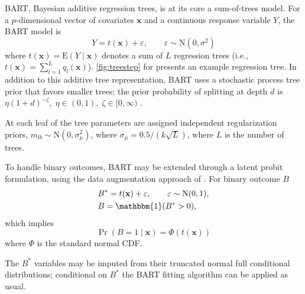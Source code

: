 \documentclass[aoas,preprint, 11pt, dvipsnames, table, x11name]{imsart}
\newcommand{\E}{\mbox{E}}
\newcommand{\N}{\mbox{N}}
\renewcommand{\bm}[1]{\mathbf{#1}}
\theoremstyle{remark}
\begin{document}
	BART, Bayesian additive regression trees, is at its core a sum-of-trees model. For a $p$-dimensional vector of covariates $\bm{x}$ and a continuous response variable $Y$, the BART model is 
	\begin{equation}
		Y=t(\bm{x})+\varepsilon, \qquad \varepsilon\sim \N(0, \sigma^2)
		\label{bart_setup}
	\end{equation}
	where $t(\bm{x})=\E(Y\mid \bm{x})$ denotes a sum of $L$ regression trees (i.e., $t(\bm{x})=\sum_{l=1}^{L} q_l(\bm{x})$). \autoref{fig:treestep} for presents an example regression tree.  In addition to this additive tree representation, BART uses a stochastic process tree prior that favors smaller trees; the prior probability of splitting at depth $d$ is $\eta(1+d)^{-\zeta}, \; \eta\in (0,1), \; \zeta\in[0, \infty)$ \citep{Chipman-1998}.    
	
	At each leaf of the tree parameters are assigned independent regularization priors, $m_{lb}\sim  \N(0, \sigma_{\mu}^2)$, where $\sigma_{\mu}=0.5/(k\sqrt{L})$, where $L$ is the number of trees. 
	
	To handle binary outcomes, BART may be extended through a latent probit formulation, using the data augmentation approach of \cite{Albert-1993}. For binary outcome $B$ 
	\begin{align*}
		&B^*=t(\bm{x})+\varepsilon, \qquad \varepsilon\sim \N(0,1),\\
		&B=\mathbbm{1}(B^*>0),
	\end{align*}
	which implies
	\begin{equation}
		\Pr(B=1\mid \bm{x})=\Phi(t(\bm{x}))
		\label{bart_binary}
	\end{equation}
	where $\Phi$ is the standard normal CDF.  
	
	The $B^*$ variables may be imputed from their truncated normal full conditional distributions; conditional on $B^*$ the BART fitting algorithm can be applied as usual.
	
\end{document}
